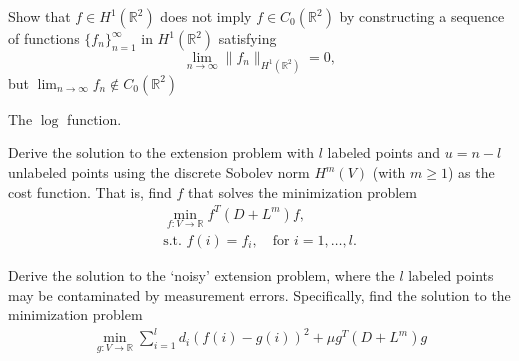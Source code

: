 \begin{myexercise}
Show that $f \in H^1(\mathbb{R}^2)$ does not imply $f\in C_0(\mathbb{R}^2)$ by constructing a sequence of functions $\{f_n\}_{n=1}^\infty$ in $H^1(\mathbb{R}^2)$ satisfying $$\lim_{n\to \infty} \|f_n\|_{H^1(\mathbb{R}^2)}=0,$$ but $\lim_{n\to \infty} f_n \notin C_0(\mathbb{R}^2)$
\begin{hint}
The $\log$ function.    
\end{hint}    
\end{myexercise}

\begin{myexercise}
Derive the solution to the extension problem with $l$ labeled points and $u=n-l$ unlabeled points using the discrete Sobolev norm $H^m(V)$ (with $m\geq 1$) as the cost function. That is, find $f$ that solves the minimization problem
\begin{eqnarray*}
\min_{f:V \to \mathbb{R}} f^T (D+L^m) f,\\
\mbox{s.t. } f(i)=f_i,\quad \mbox{for } i=1,\ldots,l.
\end{eqnarray*}
\end{myexercise}

\begin{myexercise}
Derive the solution to the `noisy' extension problem, where the $l$ labeled points may be contaminated by measurement errors. Specifically, find the solution to the minimization problem
\begin{eqnarray*}
\min_{g:V \to \mathbb{R}} \sum_{i=1}^l d_i (f(i)-g(i))^2 + \mu g^T (D+L^m) g\\
\end{eqnarray*}
\end{myexercise}

